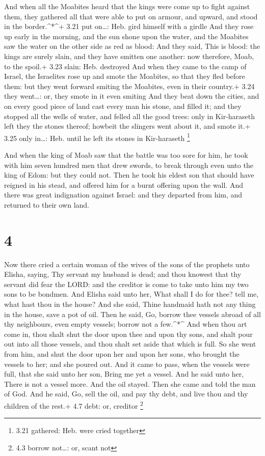 And when all the Moabites heard that the kings were come
up to fight against them, they gathered all that were able to put on
armour, and upward, and stood in the border.\^{}*\^{}+ 3.21 put
on\ldots: Heb. gird himself with a girdle  And they rose up
early in the morning, and the sun shone upon the water, and the Moabites
saw the water on the other side as red as blood:  And they
said, This is blood: the kings are surely slain, and they have smitten
one another: now therefore, Moab, to the spoil.+ 3.23 slain: Heb.
destroyed  And when they came to the camp of Israel, the
Israelites rose up and smote the Moabites, so that they fled before
them: but they went forward smiting the Moabites, even in their
country.+ 3.24 they went\ldots: or, they smote in it even smiting
 And they beat down the cities, and on every good piece of
land cast every man his stone, and filled it; and they stopped all the
wells of water, and felled all the good trees: only in Kir-haraseth left
they the stones thereof; howbeit the slingers went about it, and smote
it.+ 3.25 only in\ldots: Heb. until he left its stones in Kir-haraseth
\footnote{3.21 gathered: Heb. were cried together}

 And when the king of Moab saw that the battle was too sore
for him, he took with him seven hundred men that drew swords, to break
through even unto the king of Edom: but they could not. 
Then he took his eldest son that should have reigned in his stead, and
offered him for a burnt offering upon the wall. And there was great
indignation against Israel: and they departed from him, and returned to
their own land.

\hypertarget{section-3}{%
\section{4}\label{section-3}}

 Now there cried a certain woman of the wives of the sons of
the prophets unto Elisha, saying, Thy servant my husband is dead; and
thou knowest that thy servant did fear the LORD: and the creditor is
come to take unto him my two sons to be bondmen.  And Elisha
said unto her, What shall I do for thee? tell me, what hast thou in the
house? And she said, Thine handmaid hath not any thing in the house,
save a pot of oil.  Then he said, Go, borrow thee vessels
abroad of all thy neighbours, even empty vessels; borrow not a
few.\^{}*\^{}  And when thou art come in, thou shalt shut
the door upon thee and upon thy sons, and shalt pour out into all those
vessels, and thou shalt set aside that which is full.  So
she went from him, and shut the door upon her and upon her sons, who
brought the vessels to her; and she poured out.  And it came
to pass, when the vessels were full, that she said unto her son, Bring
me yet a vessel. And he said unto her, There is not a vessel more. And
the oil stayed.  Then she came and told the man of God. And
he said, Go, sell the oil, and pay thy debt, and live thou and thy
children of the rest.+ 4.7 debt: or, creditor \footnote{4.3 borrow
  not\ldots: or, scant not}


